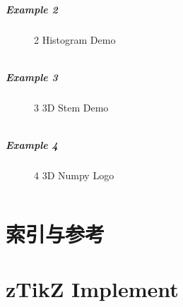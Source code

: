 \documentclass[
  hyper,    
  lang=cn,
  class=book,
  bib_index={load},
  mathSpec={envStyle=leftbar, alias},
  toc={column=2, title=目录},
]{zlatex}
\begin{document}
\subsubsection{Example 2}
\begin{figure}[!htb]
    \centering
    
    \caption{2 Histogram Demo}
    \label{fig:2-histogram-demo}
\end{figure}
\inputminted{python}{./example_2.mpl}
\newpage


\subsubsection{Example 3}
\begin{figure}[!htb]
    \centering
    
    \caption{3 3D Stem Demo}
    \label{fig:3-3d-stem-demo}
\end{figure}
\inputminted{python}{./example_3.mpl}
\newpage

\subsubsection{Example 4}
\begin{figure}[!htb]
    \centering
    
    \caption{4 3D Numpy Logo}
    \label{fig:4-numpy-logo}
\end{figure}
\inputminted{python}{./example_4.mpl}








\part{索引与参考}
\printindex








\part{zTikZ{} Implement}
\cleardoublepage
\pdfpagewidth=9in
\pdfpageheight=8in
\pagestyle{empty}
\end{document}
